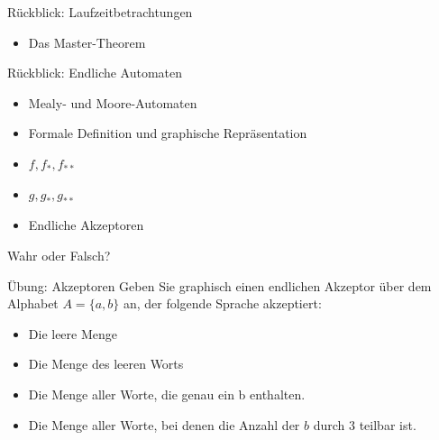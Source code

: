 


\begin{frame}{Rückblick: Laufzeitbetrachtungen}
	\begin{itemize}[<+->]
		\item Das Master-Theorem
	\end{itemize}
\end{frame}

\begin{frame}{Rückblick: Endliche Automaten}
	\begin{itemize}[<+->]
		\item Mealy- und Moore-Automaten
		\item Formale Definition und graphische Repräsentation
		\item $f, f_*, f_{**}$
		\item $g, g_*, g_{**}$
		\item Endliche Akzeptoren
	\end{itemize}
\end{frame}

\begin{frame}{Wahr oder Falsch?}
	\begin{itemize}
			\end{itemize}
\end{frame}


\begin{frame}{Übung: Akzeptoren}
	Geben Sie graphisch einen endlichen Akzeptor über dem Alphabet $A=\{a,b\}$ an, der folgende Sprache akzeptiert:
	\begin{itemize}
		\item Die leere Menge
		\item Die Menge des leeren Worts
		\item Die Menge aller Worte, die genau ein b enthalten.
		\item Die Menge aller Worte, bei denen die Anzahl der $b$ durch 3 teilbar ist.
	\end{itemize}
\end{frame}

